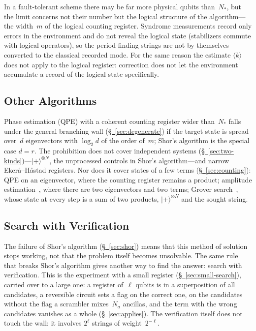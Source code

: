 \documentclass[11pt,a4paper]{article}
\begin{document}
In a fault-tolerant scheme there may be far more physical qubits than~$N_*$, but the limit concerns not their number but the logical structure of the algorithm---the width~$m$ of the logical counting register. Syndrome measurements record only errors in the environment and do not reveal the logical state (stabilizers commute with logical operators), so the period-finding strings are not by themselves converted to the classical recorded mode. For the same reason the estimate $\langle k\rangle$ does not apply to the logical register: correction does not let the environment accumulate a record of the logical state specifically.

\subsection{Other Algorithms}
\label{sec:other-alg}

Phase estimation (QPE) with a coherent counting register wider than~$N_*$ falls under the general branching wall (\hyperref[sec:degenerate]{\S~\ref*{sec:degenerate}}) if the target state is spread over~$d$ eigenvectors with $\log_2 d$ of the order of~$m$; Shor's algorithm is the special case $d=r$. The prohibition does not cover independent systems (\hyperref[sec:two-kinds]{\S~\ref*{sec:two-kinds}})---$|+\rangle^{\otimes N}$, the unprocessed controls in Shor's algorithm---and narrow Ekerå--Håstad registers. Nor does it cover states of a few terms (\hyperref[sec:counting]{\S~\ref*{sec:counting}}): QPE on an eigenvector, where the counting register remains a product; amplitude estimation~\cite{brassard2002}, where there are two eigenvectors and two terms; Grover search~\cite{grover1996}, whose state at every step is a sum of two products, $|+\rangle^{\otimes N}$ and the sought string.

\subsection{Search with Verification}
\label{sec:search}

The failure of Shor's algorithm (\hyperref[sec:shor]{\S~\ref*{sec:shor}}) means that this method of solution stops working, not that the problem itself becomes unsolvable. The same rule that breaks Shor's algorithm gives another way to find the answer: search with verification. This is the experiment with a small register (\hyperref[sec:small-search]{\S~\ref*{sec:small-search}}), carried over to a large one: a register of~$\ell$ qubits is in a superposition of all candidates, a reversible circuit sets a flag on the correct one, on the candidates without the flag a scrambler mixes~$N_a$ ancillas, and the term with the wrong candidates vanishes as a whole (\hyperref[sec:applies]{\S~\ref*{sec:applies}}). The verification itself does not touch the wall: it involves $2^\ell$ strings of weight~$2^{-\ell}$.
\end{document}
